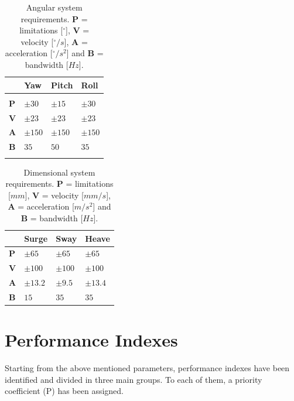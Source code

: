 \documentclass[10.5pt, twocolumn]{article}
\begin{document}
\begin{table}[h]
\centering
\begin{tabular}{C{0.5cm}C{1.3cm}C{1.3cm}C{1.3cm}}
	& \textbf{Yaw} & \textbf{Pitch} & \textbf{Roll} \\
	\hline
	\hline
	\\
	\textbf{P} & \( \pm 30 \) & \( \pm 15 \) & \( \pm 30 \) \\
	\textbf{V} & \( \pm 23 \) & \( \pm 23 \) & \( \pm 23 \) \\
	\textbf{A} & \( \pm 150 \) & \( \pm 150 \) & \( \pm 150 \) \\
	\textbf{B} & \( 35 \) & \( 50 \) & \( 35 \) \\
	\\
	\hline
\end{tabular}
\caption{Angular system requirements. \textbf{P} = limitations [\( ^\circ \)], \textbf{V} = velocity [\( ^\circ/s \)], \textbf{A} = acceleration [\( ^\circ/s^2 \)] and \textbf{B} = bandwidth [\( Hz \)].}
\label{t:SystemRequirements1}
\end{table}
\begin{table}[h]
\centering
\begin{tabular}{C{0.5cm}C{1.3cm}C{1.3cm}C{1.3cm}}
	& \textbf{Surge} & \textbf{Sway} & \textbf{Heave}\\
	\hline
	\hline
	\vspace{0.05cm}\textbf{P} & \vspace{0.05cm}\( \pm 65 \) & \vspace{0.05cm}\( \pm 65 \) & \vspace{0.05cm}\( \pm 65 \) \\
	\textbf{V} & \( \pm 100 \) & \( \pm 100 \) & \( \pm 100 \) \\
	\textbf{A} & \( \pm 13.2 \) & \( \pm 9.5 \) & \( \pm 13.4 \) \\
	\textbf{B} & \( 15 \) & \( 35 \) & \( 35 \)
	\vspace{0.15cm} \\
	\hline
\end{tabular}
\caption{Dimensional system requirements. \textbf{P} = limitations [\( mm \)], \textbf{V} = velocity [\( mm/s \)], \textbf{A} = acceleration [\( m/s^2 \)] and \textbf{B} = bandwidth [\( Hz \)].}
\label{t:SystemRequirements2}
\end{table}


\section{Performance Indexes}
Starting from the above mentioned parameters, performance indexes have been identified and divided in three main groups.
To each of them, a priority coefficient (P) has been assigned.
\end{document}
